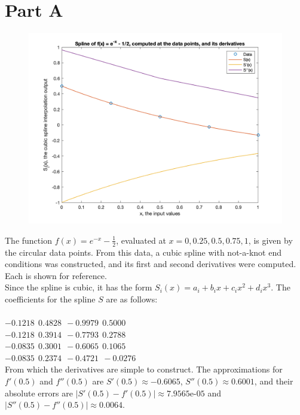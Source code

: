\documentclass[11pt, oneside]{article}   	%
\date{}							%
\begin{document}
\section*{Part A}
\begin{figure}
\begin{flushright}
\includegraphics [scale=.25] {PartA.png}
\end{flushright}
\end{figure}

The function $f(x) = e^{-x} - \frac{1}{2}$, evaluated at $x = 0, 0.25, 0.5, 0.75, 1$, is given by the circular data points. From this data, a cubic spline with not-a-knot end conditions was constructed, and its first and second derivatives were computed. Each is shown for reference.\\

Since the spline is cubic, it has the form $S_i(x) = a_i + b_ix + c_ix^2 + d_ix^3$. The coefficients for the spline $S$ are as follows: \\
$~$\\
$   -0.1218  ~~  0.4828 ~~  -0.9979 ~~ 0.5000$\\
$   -0.1218  ~~ 0.3914 ~~  -0.7793  ~~  0.2788$\\
$   -0.0835  ~~  0.3001 ~~  -0.6065  ~~  0.1065$\\
$   -0.0835  ~~  0.2374 ~~  -0.4721 ~~  -0.0276$\\

From which the derivatives are simple to construct. The approximations for $f'(0.5)$ and $f''(0.5)$ are $S'(0.5) \approx -0.6065$, $S''(0.5) \approx 0.6001$, and their absolute errors are $|S'(0.5) - f'(0.5)| \approx 7.9565$e-$05$ and $|S''(0.5) - f''(0.5)| \approx 0.0064$.
\end{document}
